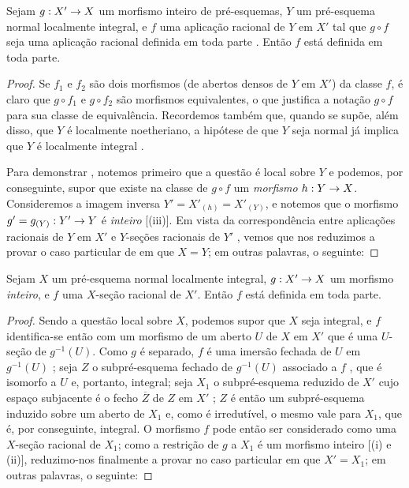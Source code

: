 \documentclass[oneside,10pt]{amsart}
\makeatletter
\newcommand{\ega@arrow}[2]{\mathchoice{#1}{#2}{#2}{#2}}
\renewcommand{\to}{\ega@arrow{\longrightarrow}{\rightarrow}}
\let\EGAOriginalLabel\label
\renewcommand{\label}[1]{\phantomsection\EGAOriginalLabel{#1}}
\makeatother
\begin{document}
\begin{proposition}[6.1.13]
\label{II.6.1.13}
Sejam $g:X'\to X$ um morfismo inteiro de pré-esquemas, $Y$ um pré-esquema normal localmente integral, e $f$ uma aplicação racional de $Y$ em $X'$ tal que $g\circ f$ seja uma aplicação racional definida em toda parte .
Então $f$ está definida em toda parte.
\end{proposition}

\begin{proof}
Se $f_1$ e $f_2$ são dois morfismos (de abertos densos de $Y$ em $X'$) da classe $f$, é claro que $g\circ f_1$ e $g\circ f_2$ são morfismos equivalentes, o que justifica a notação $g\circ f$ para sua classe de equivalência.
Recordemos também que, quando se supõe, além disso, que $Y$ é localmente noetheriano, a hipótese de que $Y$ seja normal já implica que $Y$ é localmente integral .

Para demonstrar , notemos primeiro que a questão é local sobre $Y$ e podemos, por conseguinte, supor que existe na classe de $g\circ f$ um \emph{morfismo} $h:Y\to X$.
Consideremos a imagem inversa $Y'=X'_{(h)}=X'_{(Y)}$, e notemos que o morfismo $g'=g_{(Y)}:Y'\to Y$ é \emph{inteiro} [(iii)].
Em vista da correspondência entre aplicações racionais de $Y$ em $X'$ e $Y$-seções racionais de $Y'$ , vemos que nos reduzimos a provar o caso particular de  em que $X=Y$; em outras palavras, o seguinte:
\end{proof}

\begin{corollary}[6.1.14]
\label{II.6.1.14}
Sejam $X$ um pré-esquema normal localmente integral, $g:X'\to X$ um morfismo \emph{inteiro}, e $f$ uma $X$-seção racional de $X'$.
Então $f$ está definida em toda parte.
\end{corollary}

\begin{proof}
Sendo a questão local sobre $X$, podemos supor que $X$ seja integral, e $f$ identifica-se então com um morfismo de um aberto $U$ de $X$ em $X'$  que é uma $U$-seção de $g^{-1}(U)$.
Como $g$ é separado, $f$ é uma imersão fechada de $U$ em $g^{-1}(U)$ ;
seja $Z$ o subpré-esquema fechado de $g^{-1}(U)$ associado a $f$ , que é isomorfo a $U$ e, portanto, integral;
seja $X_1$ o subpré-esquema reduzido de $X'$ cujo espaço subjacente é o fecho $\overline{Z}$ de $Z$ em $X'$ ;
$Z$ é então um subpré-esquema induzido sobre um aberto de $X_1$  e, como é irredutível, o mesmo vale para $X_1$, que é, por conseguinte, integral.
O morfismo $f$ pode então ser considerado como uma $X$-seção racional de $X_1$;
como a restrição de $g$ a $X_1$ é um morfismo inteiro [(i) e (ii)], reduzimo-nos finalmente a provar  no caso particular em que $X'=X_1$; em outras palavras, o seguinte:
\end{proof}
\end{document}
